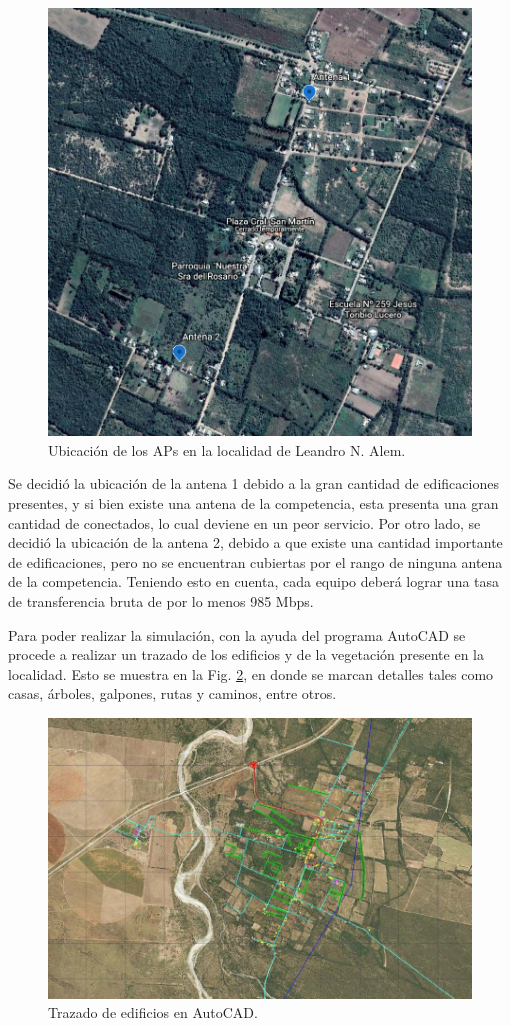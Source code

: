 \documentclass[11pt,a4paper]{article}
\begin{document}
\begin{figure}[htbp]
  \centering
  \includegraphics[width=0.8\linewidth]{fotos_ema/ubic_ap_alem.jpg}
  \caption{Ubicación de los APs en la localidad de Leandro N. Alem.}
  \label{fig:ubic_ap_alem}
\end{figure}



Se decidió la ubicación de la antena 1 debido a la gran cantidad de edificaciones presentes, y si bien existe una antena de la competencia, esta presenta una gran cantidad de conectados, lo cual deviene en un peor servicio. 
Por otro lado, se decidió la ubicación de la antena 2, debido a que existe una cantidad importante de edificaciones, pero no se encuentran cubiertas por el rango de ninguna antena de la competencia. 
Teniendo esto en cuenta, cada equipo deberá lograr una tasa de transferencia bruta de por lo menos 985 Mbps.

Para poder realizar la simulación, con la ayuda del programa AutoCAD se procede a realizar un trazado de los edificios y de la vegetación presente en la localidad. 
Esto se muestra en la Fig. \ref{fig:trazado_edif_autocad}, en donde se marcan detalles tales como casas, árboles, galpones, rutas y caminos, entre otros.

\begin{figure}[htbp]
  \centering
  \includegraphics[width=0.6\linewidth]{fotos_ema/trazado_edif_autocad.jpg}
  \caption{Trazado de edificios en AutoCAD.}
  \label{fig:trazado_edif_autocad}
\end{figure}
\end{document}

